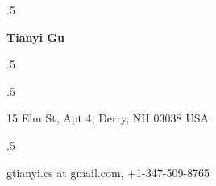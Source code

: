 \documentclass[margin, 10pt]{res} %
\begin{document}

\moveleft.5\hoffset\centerline{\large\bf Tianyi Gu}
\moveleft.5\hoffset\centerline{} 

\moveleft.5\hoffset\centerline{15 Elm St, Apt 4, Derry, NH 03038 USA}
\moveleft.5\hoffset\centerline{gtianyi.cs at gmail.com, +1-347-509-8765}
\end{document}
